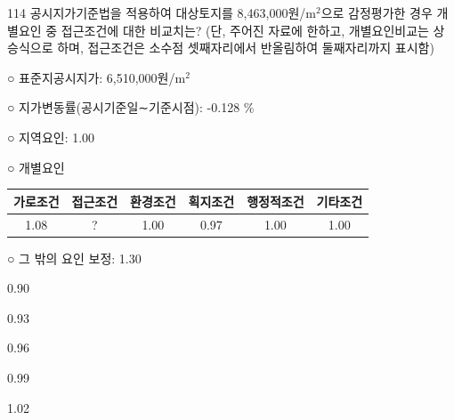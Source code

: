 \begin{question}{114}
공시지가기준법을 적용하여 대상토지를 8,463,000원/m$^{2}$으로 감정평가한 경우 개별요인 중 접근조건에 대한 비교치는? (단, 주어진 자료에 한하고, 개별요인비교는 상승식으로 하며, 접근조건은 소수점 셋째자리에서 반올림하여 둘째자리까지 표시함)
\begin{framedtext}
○ 표준지공시지가: 6,510,000원/m$^{2}$ \par
○ 지가변동률(공시기준일∼기준시점): -0.128 \% \par
○ 지역요인: 1.00 \par
○ 개별요인 \par
{\small\centering
\begin{tabular}{|c|c|c|c|c|c|}\hline
가로조건 & 접근조건 & 환경조건 & 획지조건 & 행정적조건 & 기타조건 \\ \hline
1.08 & ? & 1.00 & 0.97 & 1.00 & 1.00 \\ \hline
\end{tabular}\par}
○ 그 밖의 요인 보정: 1.30 \par
\end{framedtext}
\begin{choices}
  \item 0.90
  \item 0.93
  \item 0.96
  \item 0.99
  \item 1.02
\end{choices}
\end{question}
